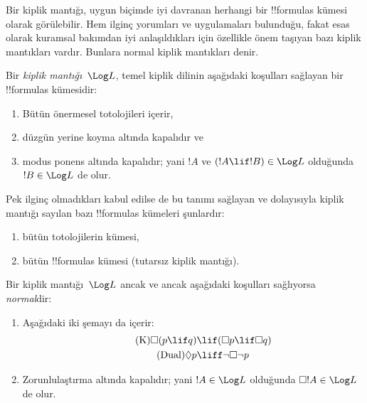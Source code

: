 



Bir kiplik mantığı, uygun biçimde iyi davranan herhangi bir !!{formula}s
kümesi olarak görülebilir. Hem ilginç yorumları ve uygulamaları bulunduğu,
fakat esas olarak kuramsal bakımdan iyi anlaşıldıkları için özellikle önem
taşıyan bazı kiplik mantıkları vardır. Bunlara normal kiplik mantıkları denir.

\begin{defn}
Bir \emph{kiplik mantığı}~$\Log L$, temel kiplik dilinin aşağıdaki koşulları
sağlayan bir !!{formula}s kümesidir:
\begin{enumerate}
\item Bütün önermesel totolojileri içerir,
\item düzgün yerine koyma altında kapalıdır ve
\item modus ponens altında kapalıdır; yani $!A$ ve $(!A \lif
  !B) \in \Log L$ olduğunda $!B \in \Log L$ de olur.
\end{enumerate}
\end{defn}

\begin{ex}
Pek ilginç olmadıkları kabul edilse de bu tanımı sağlayan ve dolayısıyla
kiplik mantığı sayılan bazı !!{formula}s kümeleri şunlardır:
\begin{enumerate}
\item bütün totolojilerin kümesi,
\item bütün !!{formula}s kümesi (tutarsız kiplik mantığı).
\end{enumerate}
\end{ex}

\begin{defn}\label{defn:normal-modal-logic}
Bir kiplik mantığı~$\Log L$ ancak ve ancak aşağıdaki koşulları sağlıyorsa
\emph{normal}dir:
\begin{enumerate}
\item Aşağıdaki iki şemayı da içerir:
\begin{align}
\tag{K} \Box(p \lif q) & \lif (\Box p \lif \Box q) \\
\tag{Dual} \Diamond p & \liff \lnot \Box \lnot p
\end{align}
\item Zorunlulaştırma altında kapalıdır; yani $!A \in
  \Log L$ olduğunda $\Box !A \in \Log L$ de olur.
\end{enumerate}
\end{defn}

